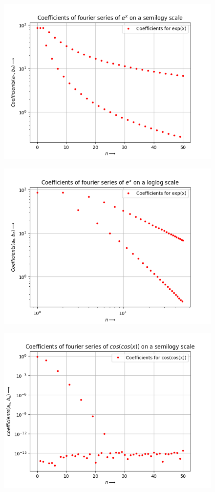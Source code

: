 \documentclass{article}
\begin{document}
\begin{figure}[h!]
    \centering
    \includegraphics[scale=0.7]{expcoeff.png}
    \label{fig:1(b)}
\end{figure}
\begin{figure}[h!]
    \centering
    \includegraphics[scale=0.7]{expcoeff1.png}
    \label{fig:1(b)}
\end{figure}
\begin{figure}[h!]
    \centering
    \includegraphics[scale=0.7]{coscoscoeff.png}
    \label{fig:1(b)}
\end{figure}
\end{document}
